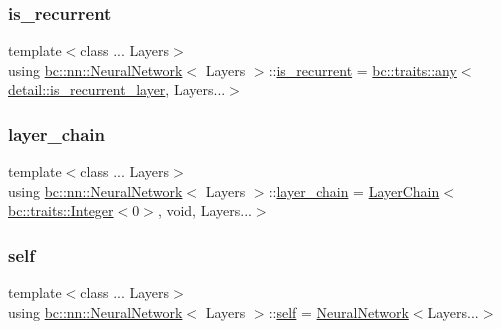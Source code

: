 \subsubsection{\texorpdfstring{is\+\_\+recurrent}{is\_recurrent}}
{\footnotesize\ttfamily template$<$class ... Layers$>$ \\
using \hyperlink{structbc_1_1nn_1_1NeuralNetwork}{bc\+::nn\+::\+Neural\+Network}$<$ Layers $>$\+::\hyperlink{structbc_1_1nn_1_1NeuralNetwork_a5661d3309e97f88e1fe580a9cc41d867}{is\+\_\+recurrent} =  \hyperlink{structbc_1_1traits_1_1any}{bc\+::traits\+::any}$<$\hyperlink{namespacebc_1_1nn_1_1detail_a05af00abf685410896e4af7ebfdc3929}{detail\+::is\+\_\+recurrent\+\_\+layer}, Layers...$>$}

\mbox{\label{structbc_1_1nn_1_1NeuralNetwork_aa313d17911ed2cfaa9355c2f7a9f6846}} 
\subsubsection{\texorpdfstring{layer\+\_\+chain}{layer\_chain}}
{\footnotesize\ttfamily template$<$class ... Layers$>$ \\
using \hyperlink{structbc_1_1nn_1_1NeuralNetwork}{bc\+::nn\+::\+Neural\+Network}$<$ Layers $>$\+::\hyperlink{structbc_1_1nn_1_1NeuralNetwork_aa313d17911ed2cfaa9355c2f7a9f6846}{layer\+\_\+chain} =  \hyperlink{structbc_1_1nn_1_1LayerChain}{Layer\+Chain}$<$ \hyperlink{structbc_1_1traits_1_1Integer}{bc\+::traits\+::\+Integer}$<$0$>$, void, Layers...$>$}

\mbox{\label{structbc_1_1nn_1_1NeuralNetwork_a4d111884489da78dc5143d0a9ea7361b}} 
\subsubsection{\texorpdfstring{self}{self}}
{\footnotesize\ttfamily template$<$class ... Layers$>$ \\
using \hyperlink{structbc_1_1nn_1_1NeuralNetwork}{bc\+::nn\+::\+Neural\+Network}$<$ Layers $>$\+::\hyperlink{structbc_1_1nn_1_1NeuralNetwork_a4d111884489da78dc5143d0a9ea7361b}{self} =  \hyperlink{structbc_1_1nn_1_1NeuralNetwork}{Neural\+Network}$<$Layers...$>$}



